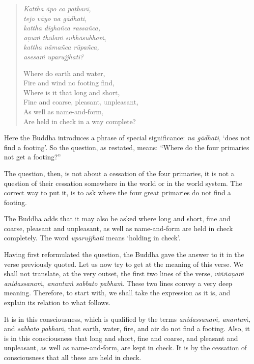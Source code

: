 \begin{quote}
\emph{Kattha āpo ca paṭhavī,}\\
\emph{tejo vāyo na gādhati,}\\
\emph{kattha dīghañca rassañca,}\\
\emph{aṇuṁ thūlaṁ subhāsubhaṁ,}\\
\emph{kattha nāmañca rūpañca,}\\
\emph{asesaṁ uparujjhati?}

Where do earth and water,\\
Fire and wind no footing find,\\
Where is it that long and short,\\
Fine and coarse, pleasant, unpleasant,\\
As well as name-and-form,\\
Are held in check in a way complete?
\end{quote}

Here the Buddha introduces a phrase of special significance: \emph{na gādhati}, `does not find a footing'. So the question, as restated, means: ``Where do the four primaries not get a footing?''

The question, then, is not about a cessation of the four primaries, it is not a question of their cessation somewhere in the world or in the world system. The correct way to put it, is to ask where the four great primaries do not find a footing.

The Buddha adds that it may also be asked where long and short, fine and coarse, pleasant and unpleasant, as well as name-and-form are held in check completely. The word \emph{uparujjhati} means `holding in check'.

Having first reformulated the question, the Buddha gave the answer to it in the verse previously quoted. Let us now try to get at the meaning of this verse. We shall not translate, at the very outset, the first two lines of the verse, \emph{viññāṇaṁ anidassanaṁ, anantaṁ sabbato pabhaṁ}. These two lines convey a very deep meaning. Therefore, to start with, we shall take the expression as it is, and explain its relation to what follows.

It is in this consciousness, which is qualified by the terms \emph{anidassanaṁ, anantaṁ}, and \emph{sabbato pabhaṁ}, that earth, water, fire, and air do not find a footing. Also, it is in this consciousness that long and short, fine and coarse, and pleasant and unpleasant, as well as name-and-form, are kept in check. It is by the cessation of consciousness that all these are held in check.
